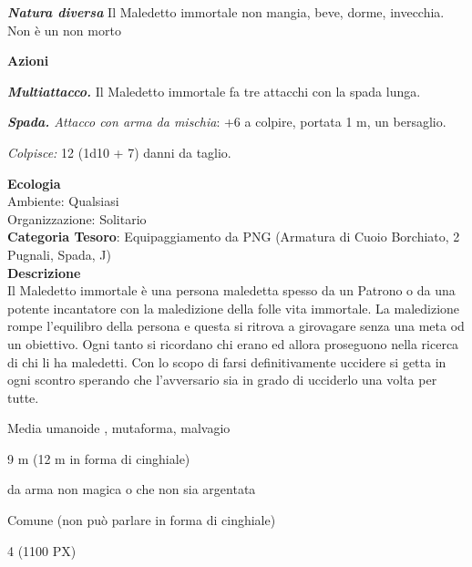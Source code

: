 \begin{multicols}{2}
{\emph{\textbf{Natura diversa}} Il Maledetto immortale non mangia, beve, dorme, invecchia. Non è un non morto

\textbf{Azioni}

\emph{\textbf{Multiattacco.}} Il Maledetto immortale fa tre attacchi con la spada lunga.

\emph{\textbf{Spada.} Attacco con arma da mischia}: +6 a colpire, portata 1 m, un bersaglio.

\emph{Colpisce:} 12 (1d10 + 7) danni da taglio.

\textbf{Ecologia}\\
Ambiente: Qualsiasi\\
Organizzazione: Solitario\\
\textbf{Categoria Tesoro}: Equipaggiamento da PNG (Armatura di Cuoio Borchiato, 2 Pugnali, Spada, J)\\
\textbf{Descrizione}\\
Il Maledetto immortale è una persona maledetta spesso da un Patrono o da una potente incantatore con la maledizione della folle vita immortale. La maledizione rompe l'equilibro della persona e questa si ritrova a girovagare senza una meta od un obiettivo. Ogni tanto si ricordano chi erano ed allora proseguono nella ricerca di chi li ha maledetti.
Con lo scopo di farsi definitivamente uccidere si getta in ogni scontro sperando che l'avversario sia in grado di ucciderlo una volta per tutte.

\label{moneteaffamate}
\begin{description}[noitemsep, topsep=0pt, parsep=0pt, partopsep=0pt, itemsep=1pt, leftmargin=2.35cm,  labelwidth=2.2cm, itemindent=0cm, listparindent=0pt] %
\setlength{\baselineskip}{10pt}
\item[\textbf{Taglia/Tipo}] Media umanoide , mutaforma, malvagio
\item[\textbf{Caratt.}] 
\item[\textbf{Punti Ferita}] 
\item[\textbf{Movimento}] 9 m (12 m in forma di cinghiale)
\item[\textbf{Tiri Salvez.}] 
\item[\textbf{Imm. Danni}] da arma non magica o che non sia argentata
\item[\textbf{Linguaggi}] Comune (non può parlare in forma di cinghiale)
\item[\textbf{Sfida}] 4 (1100 PX)
\end{description}
\smallskip

}
\end{multicols}
